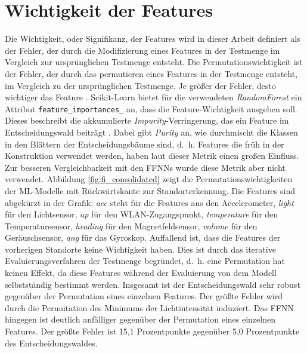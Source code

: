 \newpage
\section{Wichtigkeit der Features}
Die Wichtigkeit, oder Signifikanz, der Features wird in dieser Arbeit definiert als der Fehler,
der durch die Modifizierung eines Features in der Testmenge im Vergleich zur ursprünglichen Testmenge entsteht.
Die Permutationswichtigkeit ist der Fehler, der durch das permutieren eines Features in der Testmenge entsteht, im Vergleich zu der ursprünglichen Testmenge.
Je größer der Fehler, desto wichtiger das Feature \cite{breiman2001random}.
\newline
\newline
Scikit-Learn bietet für die verwendeten \textit{RandomForest} ein Attribut \texttt{feature\_importances\_} an, dass die Feature-Wichtigkeit ausgeben soll.
Dieses beschreibt die akkumulierte \textit{Impurity}-Verringerung, das ein Feature im Entscheidungswald beiträgt \cite{ScikitLearnFeatureImportance}.
Dabei gibt \textit{Purity} an, wie durchmischt die Klassen in den Blättern der Entscheidungsbäume sind,
d.~h. Features die früh in der Konstruktion verwendet werden, haben laut dieser Metrik einen großen Einfluss.
Zur besseren Vergleichbarkeit mit den FFNNs wurde diese Metrik aber nicht verwendet.
\newline
\newline
Abbildung \ref{fig:fi_consolidated} zeigt die Permutationswichtigkeiten der ML-Modelle mit Rückwärtskante zur Standorterkennung.
Die Features sind abgekürzt in der Grafik: \textit{acc} steht für die Features aus den Accelerometer, \textit{light} für den Lichtsensor, \textit{ap} für den WLAN-Zugangspunkt,
\textit{temperature} für den Temperatursensor, \textit{heading} für den Magnetfeldsensor, \textit{volume} für den Geräuschsensor, \textit{ang} für das Gyroskop.
\newline
\newline
Auffallend ist, dass die Features der vorherigen Standorte keine Wichtigkeit haben.
Dies ist durch das iterative Evaluierungsverfahren der Testmenge begründet,
d.~h. eine Permutation hat keinen Effekt, da diese Features während der Evaluierung von dem Modell selbstständig bestimmt werden.
Insgesamt ist der Entscheidungswald sehr robust gegenüber der Permutation eines einzelnen Features.
Der größte Fehler wird durch die Permutation des Minimums der Lichtintensität induziert.
Das FFNN hingegen ist deutlich anfälliger gegenüber der Permutation eines einzelnen Features.
Der größte Fehler ist 15,1 Prozentpunkte gegenüber 5,0 Prozentpunkte des Entscheidungswaldes.
